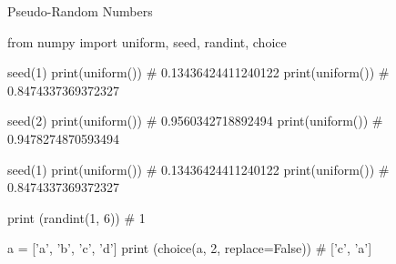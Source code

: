 \documentclass{beamer}
\begin{document}
\begin{frame}[fragile]{Pseudo-Random Numbers}  
\begin{ipython}
from numpy import uniform, seed, randint, choice

seed(1)
print(uniform())       # 0.13436424411240122
print(uniform())       # 0.8474337369372327

seed(2)
print(uniform())       # 0.9560342718892494
print(uniform())       # 0.9478274870593494

seed(1)
print(uniform())       # 0.13436424411240122
print(uniform())       # 0.8474337369372327

print (randint(1, 6)) # 1

a = ['a', 'b', 'c', 'd']
print (choice(a, 2, replace=False))  # ['c', 'a']
\end{ipython}
\end{frame}
\end{document}
